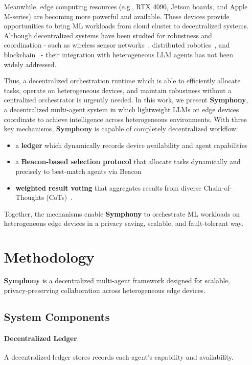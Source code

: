 \documentclass{article}
\begin{document}
Meanwhile, edge computing resources (e.g., RTX 4090, Jetson boards, and Apple M-series) are becoming more powerful and available. These devices provide opportunities to bring ML workloads from cloud cluster to decentralized systems. Although decentralized systems have been studied for robustness and coordination - such as wireless sensor networks~\cite{dimakis2010}, distributed robotics~\cite{oliva2019gossip}, and blockchain~\cite{shi2025hide} - their integration with heterogeneous LLM agents has not been widely addressed.

Thus, a decentralized orchestration runtime which is able to efficiently allocate tasks, operate on heterogeneous devices, and maintain robustness without a centralized orchestrator is urgently needed. In this work, we present \textbf{Symphony}, a decentralized multi-agent system in which lightweight LLMs on edge devices coordinate to achieve intelligence across heterogeneous environments. With three key mechanisms, \textbf{Symphony} is capable of completely decentralized workflow:
\begin{itemize}
\item a \textbf{ledger} which dynamically records device availability and agent capabilities
\item a \textbf{Beacon-based selection protocol} that allocate tasks dynamically and precisely to best-match agents via Beacon~\cite{beacon_distributed_systems}
\item \textbf{weighted result voting} that aggregates results from diverse Chain-of-Thoughts (CoTs)~\cite{wei2022chain}.
\end{itemize}

Together, the mechanisms enable \textbf{Symphony} to orchestrate ML workloads on heterogeneous edge devices in a privacy saving, scalable, and fault-tolerant way.

\section{Methodology}

\textbf{Symphony} is a decentralized multi-agent framework designed for scalable, privacy-preserving collaboration across heterogeneous edge devices. 

\subsection{System Components}

\paragraph{Decentralized Ledger}
A decentralized ledger stores records each agent's capability and availability. 
\end{document}
